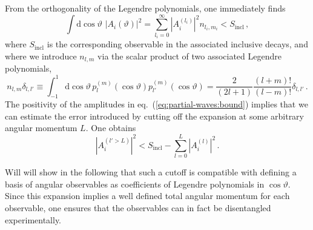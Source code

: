 \documentclass[aps,prd,reprint,nofootinbib,preprintnumbers]{revtex4}
\newcommand{\refeq}[1]{eq.~(\ref{eq:#1})}
\newcommand{\rmdx}[1]{\mbox{d} #1 \,} %
\renewcommand{\theta}{\vartheta}
\begin{document}
From the orthogonality of the Legendre polynomials, one immediately finds
\begin{equation}
    \label{eq:partial-waves:bound}
    \int \rmdx{\cos\theta}  \, |A_i(\theta)|^2 = \sum_{l_i = 0}^\infty |A_i^{(l_i)}|^2 n_{l_i, m_i} < S_\text{incl}\,,
\end{equation}
where $S_\text{incl}$ is the corresponding observable in the associated inclusive decays,
and where we introduce $n_{l,m}$ via the scalar product of two associated Legendre polynomials,
\begin{equation}
    \label{eq:legendre-scalar-product}
    n_{l, m} \delta_{l, l'} \equiv \int_{-1}^1 \rmdx{\cos\theta} p_{l}^{(m)}(\cos\theta) p_{l'}^{(m)} (\cos\theta)  = \frac{2}{(2 l + 1)} \frac{(l + m)!}{(l - m)!} \delta_{l, l'}\,.
\end{equation}
The positivity of the amplitudes in \refeq{partial-waves:bound} implies that we can estimate
the error introduced by cutting off the expansion at some arbitrary angular momentum $L$. One
obtains
\begin{equation}
    |A_i^{(l' > L)}|^2 < S_\text{incl} - \sum_{l=0}^L |A_i^{(l)}|^2\,.
\end{equation}

Will will show in the following that such a cutoff is compatible with defining a basis of angular
observables as coefficients of Legendre polynomials in $\cos\theta$. Since this expansion implies
a well defined total angular momentum for each observable, one ensures that the observables can in
fact be disentangled experimentally.\\
\end{document}
